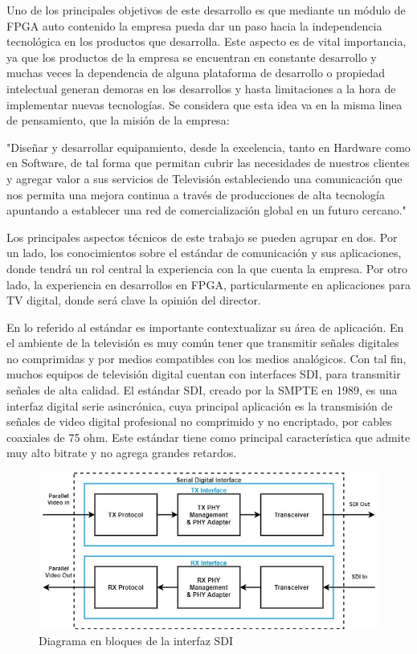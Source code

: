 \documentclass[11pt]{charter}
\begin{document}
Uno de los principales objetivos de este desarrollo es que mediante un módulo de FPGA auto contenido la empresa pueda dar un paso hacia la independencia tecnológica en los productos que desarrolla. Este aspecto es de vital importancia, ya que los productos de la empresa se encuentran en constante desarrollo y muchas veces la dependencia de alguna plataforma de desarrollo o propiedad intelectual generan demoras en los desarrollos y hasta limitaciones a la hora de implementar nuevas tecnologías. Se considera que esta idea va en la misma linea de pensamiento, que la misión de la empresa:

"Diseñar y desarrollar equipamiento, desde la excelencia, tanto en Hardware como en Software, de tal forma que permitan cubrir las necesidades de nuestros clientes y agregar valor a sus servicios de Televisión estableciendo una comunicación que nos permita una mejora continua a través de producciones de alta tecnología apuntando a establecer una red de comercialización global en un futuro cercano."

Los principales aspectos técnicos de este trabajo se pueden agrupar en dos. Por un lado, los conocimientos sobre el estándar de comunicación y sus aplicaciones, donde tendrá un rol central la experiencia con la que cuenta la empresa. Por otro lado, la experiencia en desarrollos en FPGA, particularmente en aplicaciones para TV digital, donde será clave la opinión del director.

En lo referido al estándar es importante contextualizar su área de aplicación. En el ambiente de la televisión es muy común tener que transmitir señales digitales no comprimidas y por medios compatibles con los medios analógicos. Con tal fin, muchos equipos de televisión digital cuentan con interfaces SDI, para transmitir señales de alta calidad.
El estándar SDI, creado por la SMPTE en 1989, es una interfaz digital serie asincrónica, cuya principal aplicación es la transmisión de señales de video digital profesional no comprimido y no encriptado, por cables coaxiales de 75 ohm. Este estándar tiene como principal característica que admite muy alto bitrate y no agrega grandes retardos.

\vspace{25px}

\begin{figure}[htpb]
\centering 
\includegraphics[width=.7\textwidth]{./Figuras/SDI.jpg}
\caption{Diagrama en bloques de la interfaz SDI}
\label{fig:diagBloques}
\end{figure}
\end{document}
